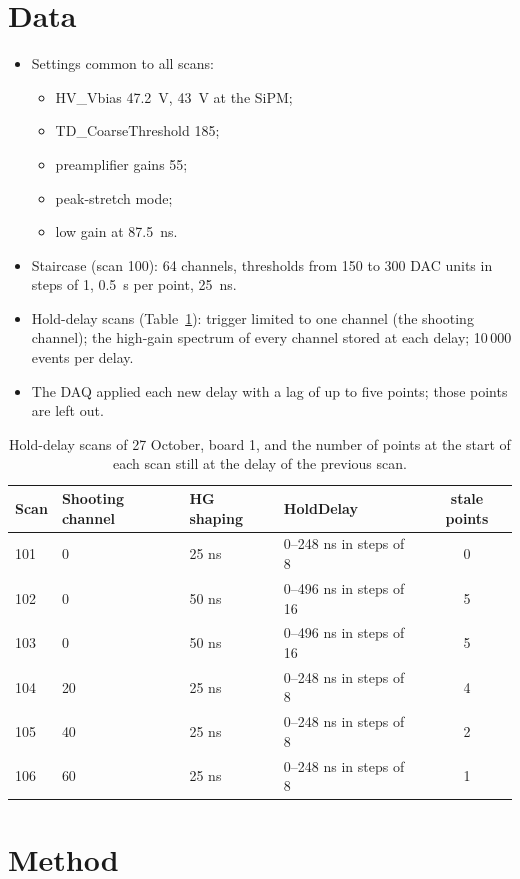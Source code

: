 \documentclass[11pt,a4paper]{article}
\begin{document}
\section{Data}

\begin{itemize}
\item Settings common to all scans:
  \begin{itemize}
  \item HV\_Vbias 47.2~V, 43~V at the SiPM;
  \item TD\_CoarseThreshold 185;
  \item preamplifier gains 55;
  \item peak-stretch mode;
  \item low gain at 87.5~ns.
  \end{itemize}
\item Staircase (scan 100): 64 channels, thresholds from 150 to 300 DAC units in steps of 1,
  0.5~s per point, 25~ns.
\item Hold-delay scans (Table~\ref{tab:scans}): trigger limited to one channel (the shooting
  channel); the high-gain spectrum of every channel stored at each delay; 10\,000 events per
  delay.
\item The DAQ applied each new delay with a lag of up to five points; those points are left
  out.
\end{itemize}

\begin{table}[H]
\centering
\small
\begin{tabular}{llllc}
\toprule
Scan & Shooting channel & HG shaping & HoldDelay & stale points \\
\midrule
101 & 0 & 25 ns & 0--248 ns in steps of 8 & 0 \\
102 & 0 & 50 ns & 0--496 ns in steps of 16 & 5 \\
103 & 0 & 50 ns & 0--496 ns in steps of 16 & 5 \\
104 & 20 & 25 ns & 0--248 ns in steps of 8 & 4 \\
105 & 40 & 25 ns & 0--248 ns in steps of 8 & 2 \\
106 & 60 & 25 ns & 0--248 ns in steps of 8 & 1 \\
\bottomrule
\end{tabular}
\caption{Hold-delay scans of 27 October, board 1, and the number of points at the start of
each scan still at the delay of the previous scan.}
\label{tab:scans}
\end{table}

\section{Method}
\label{sec:method}
\end{document}
